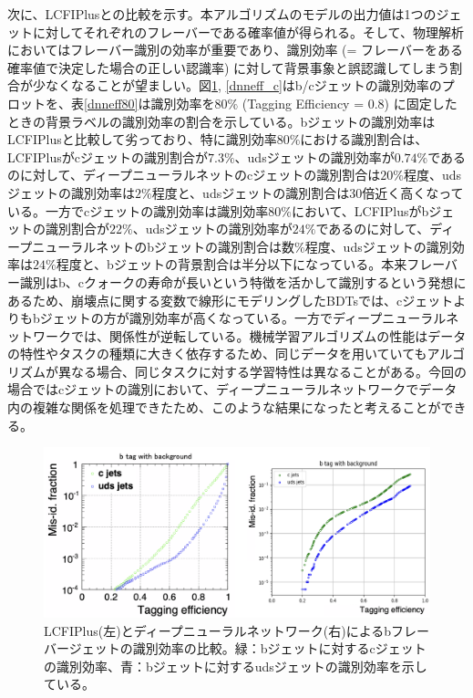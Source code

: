 次に、LCFIPlusとの比較を示す。本アルゴリズムのモデルの出力値は1つのジェットに対してそれぞれのフレーバーである確率値が得られる。そして、物理解析においてはフレーバー識別の効率が重要であり、識別効率 (= フレーバーをある確率値で決定した場合の正しい認識率) に対して背景事象と誤認識してしまう割合が少なくなることが望ましい。図\ref{dnneff_b}, \ref{dnneff_c}はb/cジェットの識別効率のプロットを、表\ref{dnneff80}は識別効率を$80\%$ (Tagging Efficiency = 0.8) に固定したときの背景ラベルの識別効率の割合を示している。bジェットの識別効率はLCFIPlusと比較して劣っており、特に識別効率$80\%$における識別割合は、LCFIPlusがcジェットの識別割合が$7.3\%$、udsジェットの識別効率が$0.74\%$であるのに対して、ディープニューラルネットのcジェットの識別割合は$20\%程度$、udsジェットの識別効率は$2\%程度$と、udsジェットの識別割合は30倍近く高くなっている。一方でcジェットの識別効率は識別効率$80\%$において、LCFIPlusがbジェットの識別割合が$22\%$、udsジェットの識別効率が$24\%$であるのに対して、ディープニューラルネットのbジェットの識別割合は$数\%程度$、udsジェットの識別効率は$24\%程度$と、bジェットの背景割合は半分以下になっている。本来フレーバー識別はb、cクォークの寿命が長いという特徴を活かして識別するという発想にあるため、崩壊点に関する変数で線形にモデリングしたBDTsでは、cジェットよりもbジェットの方が識別効率が高くなっている。一方でディープニューラルネットワークでは、関係性が逆転している。機械学習アルゴリズムの性能はデータの特性やタスクの種類に大きく依存するため、同じデータを用いていてもアルゴリズムが異なる場合、同じタスクに対する学習特性は異なることがある。今回の場合ではcジェットの識別において、ディープニューラルネットワークでデータ内の複雑な関係を処理できたため、このような結果になったと考えることができる。
\begin{figure}[H]
	\begin{center}
 \includegraphics[keepaspectratio, scale=0.3]
 	{Figure/Flavortagging/dnneff_b.png}
 		\caption{LCFIPlus(左)とディープニューラルネットワーク(右)によるbフレーバージェットの識別効率の比較。緑：bジェットに対するcジェットの識別効率、青：bジェットに対するudsジェットの識別効率を示している。}
 		\label{dnneff_b}
	\end{center}
\end{figure}

